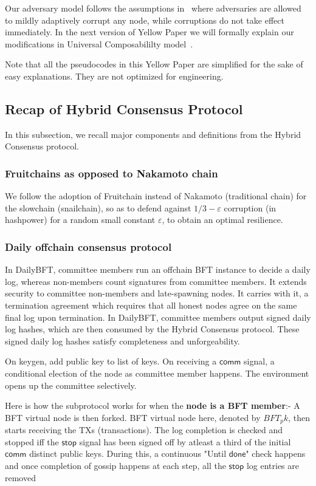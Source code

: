 \documentclass[9pt,oneside]{amsart}
\begin{document}
\begin{multicols}{2}
Our adversary model follows the assumptions in~\cite{pass2017hybrid} where adversaries are allowed to mildly adaptively corrupt any node, while corruptions
do not take effect immediately. In the next version of Yellow Paper we will formally explain our modifications in
Universal Composabililty model~\cite{canetti2001universally}.

Note that all the pseudocodes in this Yellow Paper are simplified for the sake of easy explanations. They are not optimized for engineering.

\subsection{Recap of Hybrid Consensus Protocol}

In this subsection, we recall major components and definitions from the Hybrid Consensus protocol.

\subsubsection{Fruitchains as opposed to Nakamoto chain}

We follow the adoption of Fruitchain instead of Nakamoto (traditional chain) for the slowchain (snailchain), so as to defend against $1/3 - \varepsilon$ corruption (in hashpower)
for a random small constant $\varepsilon$, to obtain an optimal resilience.

\subsubsection{Daily offchain consensus protocol}

In DailyBFT, committee members run an offchain BFT instance to decide a daily log, whereas non-members count signatures from committee members.
It extends security to committee non-members and late-spawning nodes. It carries with it, a termination agreement which requires that all honest
nodes agree on the same final log upon termination. In DailyBFT, committee members output signed daily log hashes, which are then consumed by the
Hybrid Consensus protocol. These signed daily log hashes satisfy completeness and unforgeability.

On keygen, add public key to list of keys. On receiving a $\mathsf{comm}$ signal, a conditional election of the node as committee member happens.
The environment opens up the committee selectively.

Here is how the subprotocol works for when the \textbf{node is a BFT member}:-
A BFT virtual node is then forked. BFT virtual node here, denoted by $BFT_pk$, then starts receiving the TXs (transactions).
The log completion is checked and stopped iff the $\mathsf{stop}$ signal has been signed off by atleast a third of the initial
$\mathsf{comm}$ distinct public keys. During this, a continuous "Until $\mathsf{done}$" check happens and once completion of gossip
happens at each step, all the $\mathsf{stop}$ log entries are removed


\end{multicols}
\end{document}
